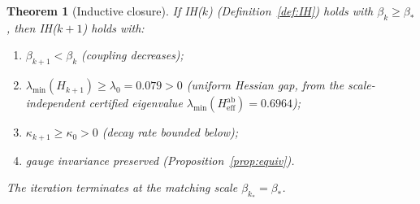 \documentclass[11pt]{article}
\newtheorem{theorem}{Theorem}[section]
\theoremstyle{definition}
\begin{document}
\begin{theorem}[Inductive closure]\label{thm:inductive}
If IH($k$) (Definition~\ref{def:IH}) holds with $\beta_k\ge\beta_*$,
then IH($k+1$) holds with:
\begin{enumerate}[nosep,label=(\roman*)]
\item $\beta_{k+1}<\beta_k$ (coupling decreases);
\item $\lambda_{\min}(H_{k+1})\ge\lambda_0=0.079>0$ (uniform
Hessian gap, from the scale-independent certified eigenvalue
$\lambda_{\min}(H_{\mathrm{eff}}^{\mathrm{ab}})=0.6964$);
\item $\kappa_{k+1}\ge\kappa_0>0$ (decay rate bounded below);
\item gauge invariance preserved (Proposition~\ref{prop:equiv}).
\end{enumerate}
The iteration terminates at the matching scale
$\beta_{k_*}=\beta_*$.
\end{theorem}
\end{document}
